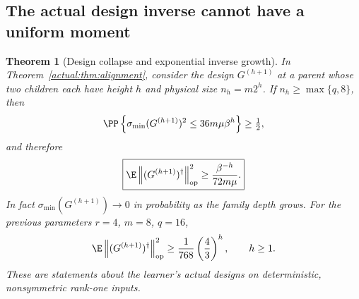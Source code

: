 \documentclass[11pt,oneside,openany,a4paper]{book}
\numberwithin{equation}{chapter}
\newtheorem{theorem}{Theorem}[chapter]
\theoremstyle{definition}
\theoremstyle{remark}
\newcommand{\op}[1]{\left\lVert#1\right\rVert_{\rm op}}
\begin{document}
\subsection{The actual design inverse cannot have a uniform moment}
\begin{theorem}[Design collapse and exponential inverse growth]\label{actual:thm:inverse}
In Theorem~\ref{actual:thm:alignment}, consider the design $G^{(h+1)}$ at a parent whose two children each have height $h$ and physical size $n_h=m2^h$. If $n_h\ge\max\{q,8\}$, then
\begin{equation}\label{actual:eq:median-collapse}
 \PP\left\{\sigma_{\min}(G^{(h+1)})^2
                     \le36m\mu\beta^h\right\}\ge\tfrac12,
\end{equation}
and therefore
\begin{equation}\label{actual:eq:inverse-growth}
 \boxed{\E\op{(G^{(h+1)})^\dagger}^2
             \ge\frac{\beta^{-h}}{72m\mu}.}
\end{equation}
In fact $\sigma_{\min}(G^{(h+1)})\to0$ in probability as the family depth grows.
For the previous parameters $r=4$, $m=8$, $q=16$,
\begin{equation}\label{actual:eq:kone}
 \E\op{(G^{(h+1)})^\dagger}^2\ge\frac1{768}
          \left(\frac43\right)^h,\qquad h\ge1.
\end{equation}
These are statements about the learner's actual designs on deterministic, nonsymmetric rank-one inputs.
\end{theorem}
\end{document}
